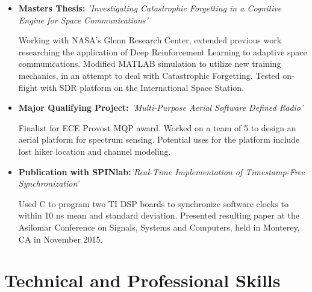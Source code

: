 \documentclass[11pt,a4paper,sans]{moderncv}        %
\begin{document}
\begin{itemize}[label={}]
\item{\textbf{Masters Thesis:} \textit{'Investigating Catastrophic Forgetting in a Cognitive Engine for Space Communications'}


\small{Working with NASA's Glenn Research Center, extended previous work researching the application of Deep Reinforcement Learning to adaptive space communications. Modified MATLAB simulation to utilize new training mechanics, in an attempt to deal with Catastrophic Forgetting. Tested on-flight with SDR platform on the International Space Station.}}

\item{\textbf{Major Qualifying Project:} \textit{'Multi-Purpose Aerial Software Defined Radio'}


\small{Finalist for ECE Provost MQP award. Worked on a team of 5 to design an aerial platform for spectrum sensing. Potential uses for the platform include lost hiker location and channel modeling. }}

\iffalse %
\item{\textbf{Interactive Qualifying Project:} \textit{'Evaluating Smart City Development in Kowloon East'}


\small{Worked on a team of 4 to evaluate the modernization of a district of Hong Kong, focusing on ease of pedestrian travel within the region. Presented to the government office responsible for development.}}
\fi %

\item{\textbf{Publication with SPINlab:}\textit{'Real-Time Implementation of Timestamp-Free Synchronization'}


\small{Used C to program two TI DSP boards to synchronize software clocks to within 10 ns mean and standard deviation. Presented resulting paper at the Asilomar Conference on Signals, Systems and Computers, held in Monterey, CA in November 2015.}}

\end{itemize}

\section{Technical and Professional Skills}
\end{document}
